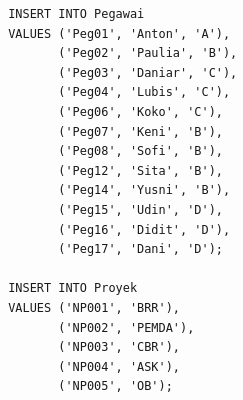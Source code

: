 \documentclass[12pt,titlepage]{article}
\begin{document}
\begin{enumerate}
{\begin{enumerate}[label=\alph*.]
{\begin{verbatim}
                    INSERT INTO Pegawai
                    VALUES ('Peg01', 'Anton', 'A'),
                           ('Peg02', 'Paulia', 'B'),
                           ('Peg03', 'Daniar', 'C'),
                           ('Peg04', 'Lubis', 'C'),
                           ('Peg06', 'Koko', 'C'),
                           ('Peg07', 'Keni', 'B'),
                           ('Peg08', 'Sofi', 'B'),
                           ('Peg12', 'Sita', 'B'),
                           ('Peg14', 'Yusni', 'B'),
                           ('Peg15', 'Udin', 'D'),
                           ('Peg16', 'Didit', 'D'),
                           ('Peg17', 'Dani', 'D');

                    INSERT INTO Proyek
                    VALUES ('NP001', 'BRR'),
                           ('NP002', 'PEMDA'),
                           ('NP003', 'CBR'),
                           ('NP004', 'ASK'),
                           ('NP005', 'OB');


\end{verbatim}}
\end{enumerate}}
\end{enumerate}
\end{document}

